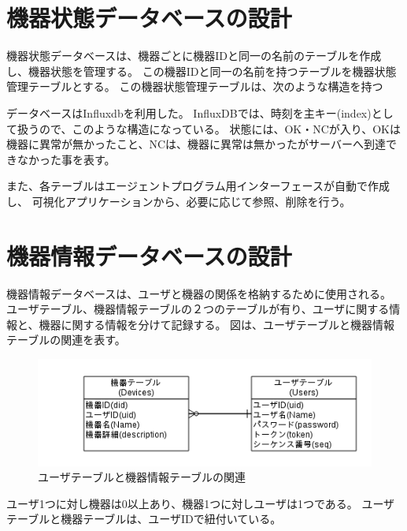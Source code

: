 \section{機器状態データベースの設計}
機器状態データベースは、機器ごとに機器IDと同一の名前のテーブルを作成し、機器状態を管理する。
この機器IDと同一の名前を持つテーブルを機器状態管理テーブルとする。
この機器状態管理テーブルは、次のような構造を持つ

データベースはInfluxdbを利用した。
InfluxDBでは、時刻を主キー(index)として扱うので、このような構造になっている。
状態には、OK・NCが入り、OKは機器に異常が無かったこと、NCは、機器に異常は無かったがサーバーへ到達できなかった事を表す。

また、各テーブルはエージェントプログラム用インターフェースが自動で作成し、
可視化アプリケーションから、必要に応じて参照、削除を行う。

\section{機器情報データベースの設計}
機器情報データベースは、ユーザと機器の関係を格納するために使用される。
ユーザテーブル、機器情報テーブルの２つのテーブルが有り、ユーザに関する情報と、機器に関する情報を分けて記録する。
図は、ユーザテーブルと機器情報テーブルの関連を表す。
\begin{figure}[htbp]
\includegraphics[width=16cm]{images/ERdiagram.png}
\caption{ユーザテーブルと機器情報テーブルの関連}
\label{fig:erdiagram}
\end{figure}
ユーザ1つに対し機器は0以上あり、機器1つに対しユーザは1つである。
ユーザテーブルと機器テーブルは、ユーザIDで紐付いている。

